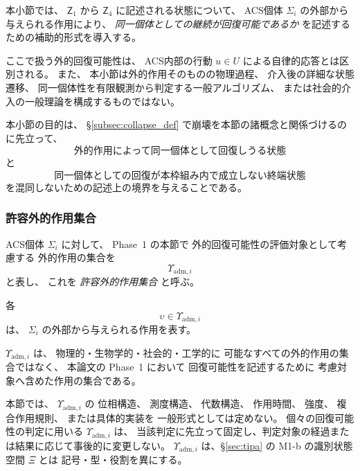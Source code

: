 本小節では、
$\mathsf{Z}_1$ から $\mathsf{Z}_4$ に記述される状態について、
ACS個体 $\Sigma_i$ の外部から与えられる作用により、
\emph{同一個体としての継続が回復可能であるか}
を記述するための補助的形式を導入する。

ここで扱う外的回復可能性は、
ACS内部の行動 $u\in U$ による自律的応答とは区別される。
また、
本小節は外的作用そのものの物理過程、
介入後の詳細な状態遷移、
同一個体性を有限観測から判定する一般アルゴリズム、
または社会的介入の一般理論を構成するものではない。

本小節の目的は、
\S\ref{subsec:collapse_def} で崩壊を本節の諸概念と関係づけるのに先立って、
\[
  \text{外的作用によって同一個体として回復しうる状態}
\]
と
\[
  \text{同一個体としての回復が本枠組み内で成立しない終端状態}
\]
を混同しないための記述上の境界を与えることである。

\subsubsection{許容外的作用集合}

\begin{definition}
\label{def:admissible_external_action}
ACS個体 $\Sigma_i$ に対して、
Phase~1 の本節で
外的回復可能性の評価対象として考慮する
外的作用の集合を
\[
  \Upsilon_{\mathrm{adm},i}
\]
と表し、
これを
\emph{許容外的作用集合}
と呼ぶ。

各
\[
  \upsilon\in\Upsilon_{\mathrm{adm},i}
\]
は、
$\Sigma_i$ の外部から与えられる作用を表す。

$\Upsilon_{\mathrm{adm},i}$ は、
物理的・生物学的・社会的・工学的に
可能なすべての外的作用の集合ではなく、
本論文の Phase~1 において
回復可能性を記述するために
考慮対象へ含めた作用の集合である。

本節では、
$\Upsilon_{\mathrm{adm},i}$ の
位相構造、
測度構造、
代数構造、
作用時間、
強度、
複合作用規則、
または具体的実装を
一般形式としては定めない。
個々の回復可能性の判定に用いる $\Upsilon_{\mathrm{adm},i}$ は、
当該判定に先立って固定し、判定対象の経過または結果に応じて事後的に変更しない。
$\Upsilon_{\mathrm{adm},i}$ は、\S\ref{sec:tipa} の M1-b の識別状態空間 $\Xi$ とは
記号・型・役割を異にする。
\end{definition}

